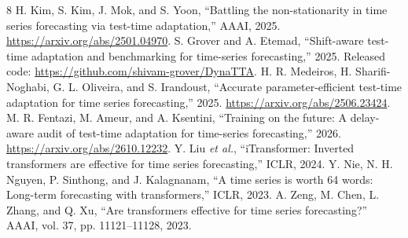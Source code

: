 \documentclass[conference]{IEEEtran}
\begin{document}
\begin{thebibliography}{8}
 H. Kim, S. Kim, J. Mok, and S. Yoon, ``Battling the non-stationarity in time series forecasting via test-time adaptation,'' AAAI, 2025. \url{https://arxiv.org/abs/2501.04970}.
 S. Grover and A. Etemad, ``Shift-aware test-time adaptation and benchmarking for time-series forecasting,'' 2025. Released code: \url{https://github.com/shivam-grover/DynaTTA}.
 H. R. Medeiros, H. Sharifi-Noghabi, G. L. Oliveira, and S. Irandoust, ``Accurate parameter-efficient test-time adaptation for time series forecasting,'' 2025. \url{https://arxiv.org/abs/2506.23424}.
 M. R. Fentazi, M. Ameur, and A. Ksentini, ``Training on the future: A delay-aware audit of test-time adaptation for time-series forecasting,'' 2026. \url{https://arxiv.org/abs/2610.12232}.
 Y. Liu \emph{et al.}, ``iTransformer: Inverted transformers are effective for time series forecasting,'' ICLR, 2024.
 Y. Nie, N. H. Nguyen, P. Sinthong, and J. Kalagnanam, ``A time series is worth 64 words: Long-term forecasting with transformers,'' ICLR, 2023.
 A. Zeng, M. Chen, L. Zhang, and Q. Xu, ``Are transformers effective for time series forecasting?'' AAAI, vol. 37, pp. 11121--11128, 2023.
\end{thebibliography}
\end{document}
